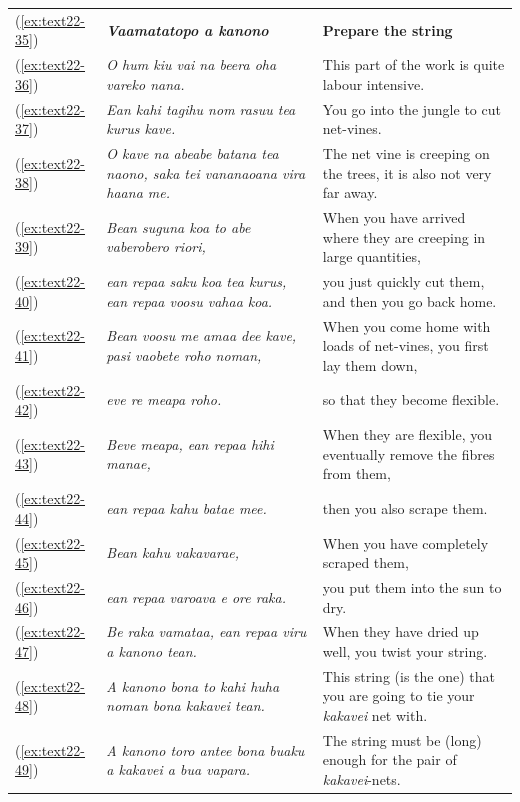 \documentclass[output=paper]{langscibook}
\begin{document}
\begin{xltabular}{\textwidth}{lXX}
	(\ref{ex:text22-35})&\textit{\textbf{Vaamatatopo a kanono}}&\textbf{Prepare the string}\\
	(\ref{ex:text22-36})&\textit{O hum kiu vai na beera oha vareko nana.}&This part of the work is quite labour intensive.\\
	(\ref{ex:text22-37})&\textit{Ean kahi tagihu nom rasuu tea kurus kave.}&You go into the jungle to cut net-vines.\\
	(\ref{ex:text22-38})&\textit{O kave na abeabe batana tea naono, saka tei vananaoana vira haana me.}&The net vine is creeping on the trees, it is also not very far away.\\
	(\ref{ex:text22-39})&\textit{Bean suguna koa to abe vaberobero riori,}&When you have arrived where they are creeping in large quantities,\\
	(\ref{ex:text22-40})&\textit{ean repaa saku koa tea kurus, ean repaa voosu vahaa koa.}&you just quickly cut them, and then you go back home.\\
	(\ref{ex:text22-41})&\textit{Bean voosu me amaa dee kave, pasi vaobete roho noman,}&When you come home with loads of net-vines, you first lay them down,\\
	(\ref{ex:text22-42})&\textit{eve re meapa roho.}&so that they become flexible.\\
	(\ref{ex:text22-43})&\textit{Beve meapa, ean repaa hihi manae,}&When they are flexible, you eventually remove the fibres from them,\\
	(\ref{ex:text22-44})&\textit{ean repaa kahu batae mee.}&then you also scrape them.\\
	(\ref{ex:text22-45})&\textit{Bean kahu vakavarae,}&When you have completely scraped them,\\
	(\ref{ex:text22-46})&\textit{ean repaa varoava e ore raka.}&you put them into the sun to dry.\\
	(\ref{ex:text22-47})&\textit{Be raka vamataa, ean repaa viru a kanono tean.}&When they have dried up well, you twist your string.\\
	(\ref{ex:text22-48})&\textit{A kanono bona to kahi huha noman bona kakavei tean.}&This string (is the one) that you are going to tie your \textit{kakavei} net with.\\
	(\ref{ex:text22-49})&\textit{A kanono toro antee bona buaku a kakavei a bua vapara.}&The string must be (long) enough for the pair of \textit{kakavei}-nets.\\
\end{xltabular}
\end{document}
